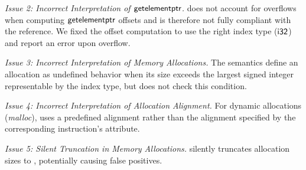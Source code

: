 \textit{Issue 2: Incorrect Interpretation of \textup{$\textsf{getelementptr}$}.}
\klee does not account for overflows when computing $\textsf{getelementptr}$ offsets and is therefore not fully compliant with the \llvm reference.
We fixed the offset computation to use the right index type ($\textsf{i32}$) and report an error upon overflow.

\textit{Issue 3: Incorrect Interpretation of Memory Allocations.}
The \llvm semantics define an allocation as undefined behavior when its size exceeds the largest signed integer representable by the index type, but \klee does not check this condition.

\textit{Issue 4: Incorrect Interpretation of Allocation Alignment.}
For dynamic allocations (\eg \textit{malloc}), \klee uses a predefined alignment rather than the alignment specified by the corresponding instruction's  attribute.

\textit{Issue 5: Silent Truncation in Memory Allocations.}
\klee silently truncates allocation sizes to , potentially causing false positives.


%
%
%
%


